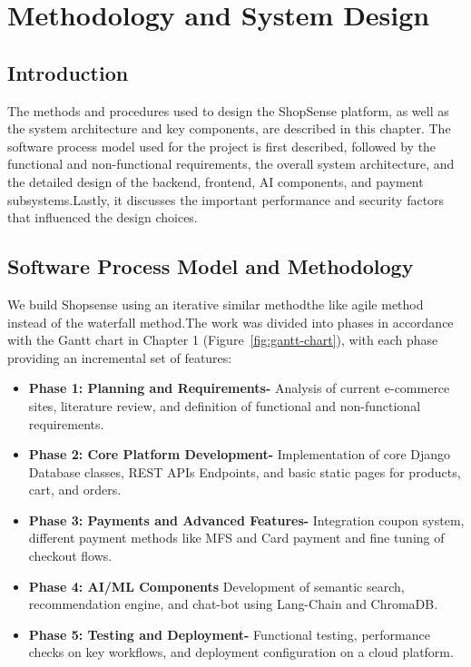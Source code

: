 \chapter{Methodology and System Design}

\section{Introduction}
The methods and procedures used to design the ShopSense platform, as well as the system architecture and key components, are described in this chapter. The software process model used for the project is first described, followed by the functional and non-functional requirements, the overall system architecture, and the detailed design of the backend, frontend, AI components, and payment subsystems.Lastly, it discusses the important performance and security factors that influenced the design choices.

\section{Software Process Model and Methodology}

We build Shopsense using an iterative similar methodthe  like agile method instead of the waterfall method.The work was divided into phases in accordance with the Gantt chart in Chapter 1 (Figure~\ref{fig:gantt-chart}), with each phase providing an incremental set of features:


\begin{itemize}
  \item \textbf{Phase 1: Planning and Requirements-} Analysis of current e-commerce sites, literature review, and definition of functional and non-functional requirements.
  \item \textbf{Phase 2: Core Platform Development-} Implementation of core Django Database classes, REST APIs Endpoints, and basic static pages for products, cart, and orders.
  \item \textbf{Phase 3: Payments and Advanced Features-} Integration coupon system, different payment methods like MFS and Card payment and fine tuning of checkout flows.
  \item \textbf{Phase 4: AI/ML Components} Development of semantic search, recommendation engine, and chat-bot using Lang-Chain and ChromaDB.
  \item \textbf{Phase 5: Testing and Deployment-} Functional testing, performance checks on key workflows, and deployment configuration on a cloud platform.
\end{itemize}

